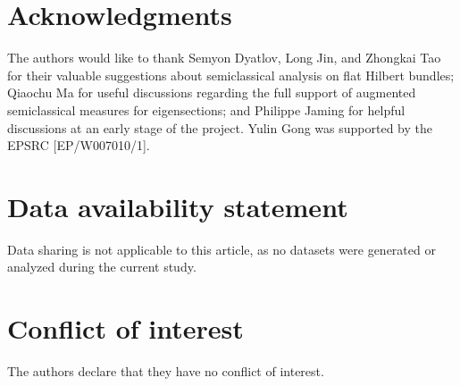 \documentclass[11pt,oneside,reqno]{amsart}
\theoremstyle{definition}
\numberwithin{equation}{section}
\theoremstyle{plain}
\begin{document}
\section*{Acknowledgments}
The authors would like to thank Semyon Dyatlov, Long Jin, and Zhongkai Tao for their valuable suggestions about semiclassical analysis on flat Hilbert bundles; Qiaochu Ma for useful discussions regarding the full support of augmented semiclassical measures for eigensections; and Philippe Jaming for helpful discussions at an early stage of the project. Yulin Gong was supported by the EPSRC [EP/W007010/1].


\section*{Data availability statement}

Data sharing is not applicable to this article, as no datasets were generated or analyzed during the current study.

\section*{Conflict of interest}

The authors declare that they have no conflict of interest.





\end{document}
